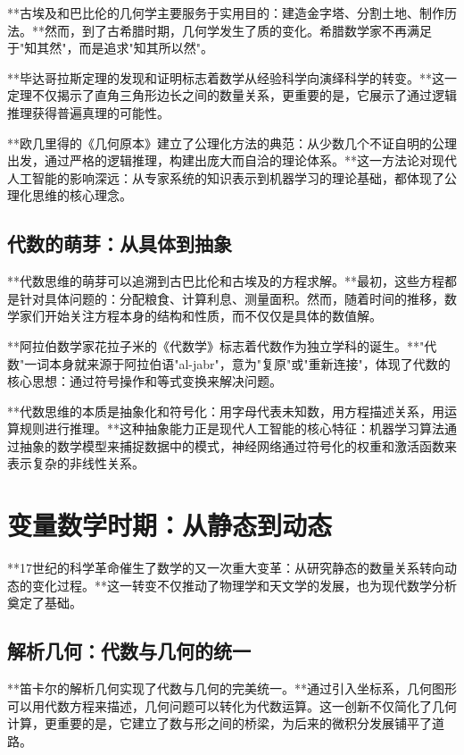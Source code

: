 **古埃及和巴比伦的几何学主要服务于实用目的：建造金字塔、分割土地、制作历法。**然而，到了古希腊时期，几何学发生了质的变化。希腊数学家不再满足于"知其然"，而是追求"知其所以然"。

**毕达哥拉斯定理的发现和证明标志着数学从经验科学向演绎科学的转变。**这一定理不仅揭示了直角三角形边长之间的数量关系，更重要的是，它展示了通过逻辑推理获得普遍真理的可能性。

**欧几里得的《几何原本》建立了公理化方法的典范：从少数几个不证自明的公理出发，通过严格的逻辑推理，构建出庞大而自洽的理论体系。**这一方法论对现代人工智能的影响深远：从专家系统的知识表示到机器学习的理论基础，都体现了公理化思维的核心理念。

\subsection{代数的萌芽：从具体到抽象}

**代数思维的萌芽可以追溯到古巴比伦和古埃及的方程求解。**最初，这些方程都是针对具体问题的：分配粮食、计算利息、测量面积。然而，随着时间的推移，数学家们开始关注方程本身的结构和性质，而不仅仅是具体的数值解。

**阿拉伯数学家花拉子米的《代数学》标志着代数作为独立学科的诞生。**"代数"一词本身就来源于阿拉伯语"al-jabr"，意为"复原"或"重新连接"，体现了代数的核心思想：通过符号操作和等式变换来解决问题。

**代数思维的本质是抽象化和符号化：用字母代表未知数，用方程描述关系，用运算规则进行推理。**这种抽象能力正是现代人工智能的核心特征：机器学习算法通过抽象的数学模型来捕捉数据中的模式，神经网络通过符号化的权重和激活函数来表示复杂的非线性关系。

\section{变量数学时期：从静态到动态}

**17世纪的科学革命催生了数学的又一次重大变革：从研究静态的数量关系转向动态的变化过程。**这一转变不仅推动了物理学和天文学的发展，也为现代数学分析奠定了基础。

\subsection{解析几何：代数与几何的统一}

**笛卡尔的解析几何实现了代数与几何的完美统一。**通过引入坐标系，几何图形可以用代数方程来描述，几何问题可以转化为代数运算。这一创新不仅简化了几何计算，更重要的是，它建立了数与形之间的桥梁，为后来的微积分发展铺平了道路。

